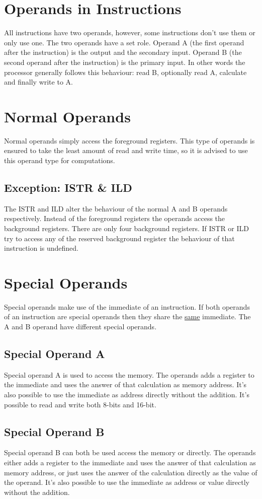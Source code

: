 \documentclass[oneside, a4paper]{memoir}
\begin{document}
\section{Operands in Instructions}
All instructions have two operands, however, some instructions don't use them or only use one. The two operands have a set role. Operand A (the first operand after the instruction) is the output and the secondary input. Operand B (the second operand after the instruction) is the primary input. In other words the processor generally follows this behaviour: read B, optionally read A, calculate and finally write to A.
\section{Normal Operands}
Normal operands simply access the foreground registers. This type of operands is ensured to take the least amount of read and write time, so it is advised to use this operand type for computations.
\subsection{Exception: ISTR \& ILD}
The ISTR and ILD alter the behaviour of the normal A and B operands respectively. Instead of the foreground registers the operands access the background registers. There are only four background registers. If ISTR or ILD try to access any of the reserved background register the behaviour of that instruction is undefined.
\section{Special Operands}
Special operands make use of the immediate of an instruction. If both operands of an instruction are special operands then they share the \underline{same} immediate. The A and B operand have different special operands.
\subsection{Special Operand A}
Special operand A is used to access the memory. The operands adds a register to the immediate and uses the answer of that calculation as memory address. It's also possible to use the immediate as address directly without the addition. It's possible to read and write both 8-bits and 16-bit.
\subsection{Special Operand B}
Special operand B can both be used access the memory or directly. The operands either adds a register to the immediate and uses the answer of that calculation as memory address, or just uses the answer of the calculation directly as the value of the operand. It's also possible to use the immediate as address or value directly without the addition.
\end{document}
